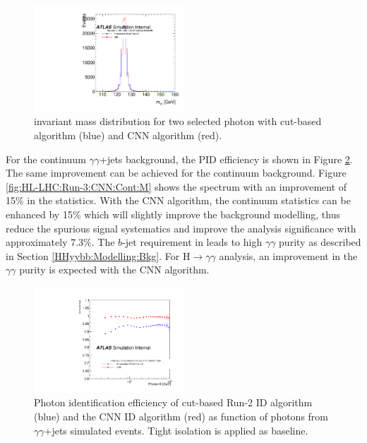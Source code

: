 \begin{figure}[htbp]
    \centering
    \includegraphics[width=0.5\textwidth]{Ch6/Img/Eff_MixtureNN_All_Inclusive_Tight_M.pdf}
     \begin{tcolorbox}[colback=black!5!white, colframe=white!75!black]
    \caption{\myy invariant mass distribution for two selected photon with cut-based algorithm (blue) and CNN algorithm (red).}
    \label{fig:HL-LHC:Run-3:CNN:M}
    \end{tcolorbox}
\end{figure}

For the continuum $\gamma\gamma$+jets background, the PID efficiency is shown in Figure \ref{fig:HL-LHC:Run-3:CNN:Cont:E}. The same improvement can be achieved for the continuum background. Figure \ref{fig:HL-LHC:Run-3:CNN:Cont:M} shows the \myy spectrum with an improvement of 15\% in the statistics. With the CNN algorithm, the continuum statistics can be enhanced by 15\% which will slightly improve the background modelling, thus reduce the spurious signal systematics and improve the analysis significance with approximately 7.3\%. The $b$-jet requirement in \HHyybb leads to high $\gamma\gamma$ purity as described in Section \ref{HHyybb:Modelling:Bkg}. For H$\to\gamma\gamma$ analysis, an improvement in the $\gamma\gamma$ purity is expected with the CNN algorithm.

\begin{figure}[htbp]
    \centering
    \includegraphics[width=0.5\textwidth]{Ch6/Img/Eff_Tight_All_Inclusive_Tight_E.pdf}
    \begin{tcolorbox}[colback=black!5!white, colframe=white!75!black]
    \caption{Photon identification efficiency of cut-based Run-2 ID algorithm (blue) and the CNN ID algorithm (red) as function of photons \eT from $\gamma\gamma$+jets simulated events. Tight isolation is applied as baseline.}
    \label{fig:HL-LHC:Run-3:CNN:Cont:E}
    \end{tcolorbox}
\end{figure}

